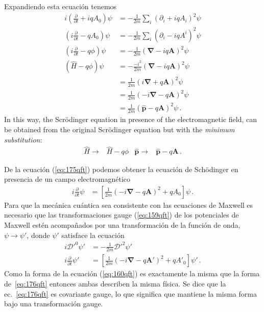 \begin{subappendices}
Expandiendo esta ecuación tenemos 
\begin{align}
\label{eq:175qft}
   i\left(\frac{\partial}{\partial t}+iqA_0\right)\psi
&=-\frac{1}{2m}\sum_i(\partial_i+i q A_i)^2\psi\nonumber\\
   \left(i\frac{\partial}{\partial t}-qA_0\right)\psi
 &=-\frac{1}{2m}\sum_i(\partial_i-i q A^i)^2\psi\nonumber\\
   \left(i\frac{\partial}{\partial t}-q\phi\right)\psi
&=-\frac{1}{2m}(\boldsymbol{\nabla}-i q \mathbf{A})^2\psi\nonumber\\
   \left(\widehat{H}-q\phi\right)\psi
&=-\frac{-i^2}{2m}(\boldsymbol{\nabla}-i q \mathbf{A})^2\psi\nonumber\\
&=\frac{1}{2m}(i\boldsymbol{\nabla}+ q \mathbf{A})^2\psi\nonumber\\
&=\frac{1}{2m}(-i\boldsymbol{\nabla}- q \mathbf{A})^2\psi\nonumber\\
&=\frac{1}{2m}(\widehat{\mathbf{p}}- q \mathbf{A})^2\psi\,.
\end{align}
In this way, the Scrödinger equation in presence of the electromagnetic field, can be obtained from the original Scrödinger equation but with the \emph{minimum substitution}:
\begin{align}
  \widehat{H}\to& \widehat{H}-q\phi & \widehat{\mathbf{p}}\to&\widehat{\mathbf{p}}-q\mathbf{A}\,.
\end{align}



De la ecuación (\ref{eq:175qft}) podemos obtener la ecuación de Schödinger en presencia de un campo electromagnético
\begin{align}
\label{eq:176qft}
 i\frac{\partial}{\partial t}\psi&=\left[\frac{1}{2m}(-i\mathbf{\nabla}-q\mathbf{A})^2+qA_0\right]\psi\,.
\end{align}
 Para que la mecánica cuántica sea consistente con las ecuaciones de Maxwell es necesario que las transformaciones gauge (\ref{eq:159qft}) de los potenciales de Maxwell estén acompañados por una transformación de la función de onda, $\psi\to\psi'$, donde $\psi'$ satisface la ecuación
\begin{align}
  \label{eq:160qft}
   i{\mathcal{D}'}^0\psi'&=-\frac{1}{2m}{\boldsymbol{\mathcal{D}}'}^2\psi'\nonumber\\
 i\frac{\partial}{\partial t}\psi'&=\left[\frac{1}{2m}(-i\mathbf{\nabla}-q\mathbf{A}')^2+q{A'}_0\right]\psi'\,.
\end{align}
Como la forma de la ecuación (\ref{eq:160qft}) es exactamente la misma que la forma de~\eqref{eq:176qft} entonces ambas describen la misma física. Se dice que  la ec.~\eqref{eq:176qft} es covariante gauge, lo que significa que mantiene la misma forma bajo una transformación gauge. 


\end{subappendices}
